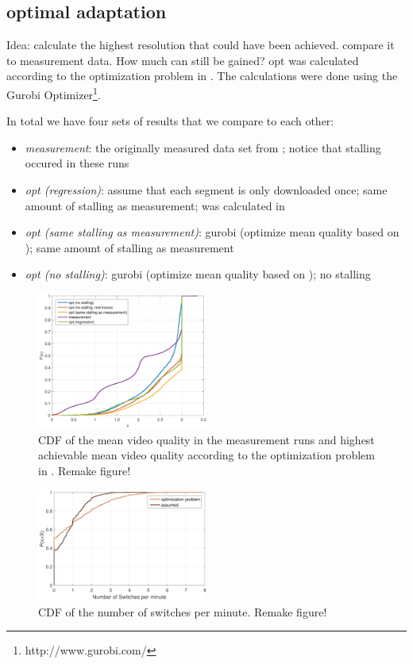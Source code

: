 \subsection{optimal adaptation}

Idea: calculate the highest resolution that could have been achieved. compare it to measurement data. How much can still be gained?
opt was calculated according to the optimization problem in \cite{hossfeld2015identifying}. The calculations were done using the Gurobi Optimizer\footnote{http://www.gurobi.com/}.

In total we have four sets of results that we compare to each other:
\begin{itemize}
\item \textit{measurement}: the originally measured data set from \cite{sieber16sacrificing}; notice that stalling occured in these runs
\item \textit{opt (regression)}: assume that each segment is only downloaded once; same amount of stalling as measurement; was calculated in \cite{sieber16sacrificing}
\item \textit{opt (same stalling as measurement)}: gurobi (optimize mean quality based on \cite{hossfeld2015identifying}); same amount of stalling as measurement
\item \textit{opt (no stalling)}: gurobi (optimize mean quality based on \cite{hossfeld2015identifying}); no stalling
\end{itemize}

\begin{figure}[t]
\centering
\includegraphics[width=0.5\textwidth]{figs/quality}%
\caption{CDF of the mean video quality in the measurement runs and highest achievable mean video quality according to the optimization problem in \cite{hossfeld2015identifying}. Remake figure!}
\label{fig:opt}%
\end{figure}

\begin{figure}[t]
\centering
\includegraphics[width=0.5\textwidth]{figs/switches}%
\caption{CDF of the number of switches per minute. Remake figure!}
\label{fig:switches}%
\end{figure}

